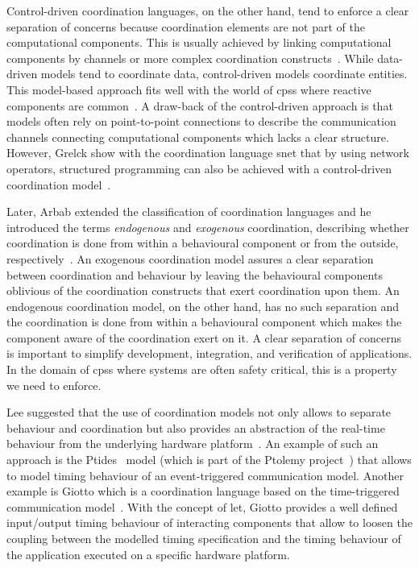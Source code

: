 Control-driven coordination languages, on the other hand, tend to enforce a clear separation of concerns because coordination elements are not part of the computational components.
This is usually achieved by linking computational components by channels or more complex coordination constructs~\cite{arbab1993, arbab2004}.
While data-driven models tend to coordinate data, control-driven models coordinate entities.
This model-based approach fits well with the world of \glspl{cps} where reactive components are common~\cite{henzinger2006, rajkumar2010, castrillon2015}.
A draw-back of the control-driven approach is that models often rely on point-to-point connections to describe the communication channels connecting computational components which lacks a clear structure.
However, Grelck \etal show with the coordination language \gls*{snet} that by using network operators, structured programming can also be achieved with a control-driven coordination model~\cite{grelck2010}.

Later, Arbab extended the classification of coordination languages and he introduced the terms \emph{endogenous} and \emph{exogenous} coordination, describing whether coordination is done from within a behavioural component or from the outside, respectively~\cite{arbab2006}.
An exogenous coordination model assures a clear separation between coordination and behaviour by leaving the behavioural components oblivious of the coordination constructs that exert coordination upon them.
An endogenous coordination model, on the other hand, has no such separation and the coordination is done from within a behavioural component which makes the component aware of the coordination exert on it.
A clear separation of concerns is important to simplify development, integration, and verification of applications.
In the domain of \glspl{cps} where systems are often safety critical, this is a property we need to enforce.

Lee suggested that the use of coordination models not only allows to separate behaviour and coordination but also provides an abstraction of the real-time behaviour from the underlying hardware platform~\cite{lee2008}.
An example of such an approach is the Ptides~\cite{derler2008} model (which is part of the Ptolemy project~\cite{ptolemaeus2014}) that allows to model timing behaviour of an event-triggered communication model.
Another example is Giotto which is a coordination language based on the time-triggered communication model~\cite{henzinger2001}.
With the concept of \gls{let}, Giotto provides a well defined input/output timing behaviour of interacting components that allow to loosen the coupling between the modelled timing specification and the timing behaviour of the application executed on a specific hardware platform.
